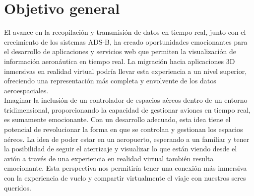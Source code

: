 \documentclass[a4paper, 11pt]{book}
\begin{document}
\section{Objetivo general}
\label{sec:objetivoGeneral}
El avance en la recopilación y transmisión de datos en tiempo real, junto con el crecimiento de los sistemas \textsc{ADS-B}, ha creado oportunidades emocionantes para el desarrollo de aplicaciones y servicios web que permiten la visualización de información aeronáutica en tiempo real. La migración hacia aplicaciones \textsc{3D} inmersivas en realidad virtual podría llevar esta experiencia a un nivel superior, ofreciendo una representación más completa y envolvente de los datos aeroespaciales.\\
Imaginar la inclusión de un controlador de espacios aéreos dentro de un entorno tridimensional, proporcionando la capacidad de gestionar aviones en tiempo real, es sumamente emocionante. Con un desarrollo adecuado, esta idea tiene el potencial de revolucionar la forma en que se controlan y gestionan los espacios aéreos.
La idea de poder estar en un aeropuerto, esperando a un familiar y tener la posibilidad de seguir el aterrizaje y visualizar lo que están viendo desde el avión a través de una experiencia en realidad virtual también resulta emocionante. Esta perspectiva nos permitiría tener una conexión más inmersiva con la experiencia de vuelo y compartir virtualmente el viaje con nuestros seres queridos. 
\end{document}
